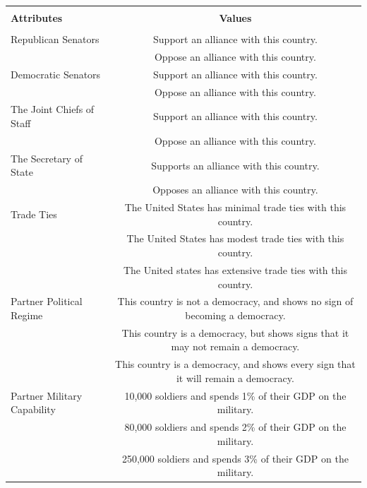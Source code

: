 \documentclass[12pt]{article}
\begin{document}
\begin{table}[htpb]
\begin{center}
\begin{adjustbox}{width = .85\textwidth}
\begin{tabular}{lc} 
\hline \\ 
\textbf{Attributes} & \textbf{Values} \\
\hline \\ 
Republican Senators & Support an alliance with this country. \\
                    & Oppose an alliance with this country. \\ 
                    
Democratic Senators & Support an alliance with this country. \\
                    & Oppose an alliance with this country. \\ 
                    
The Joint Chiefs of Staff & Support an alliance with this country. \\
                    & Oppose an alliance with this country. \\ 
                    
The Secretary of State & Supports an alliance with this country. \\
                    & Opposes an alliance with this country. \\ 
                    
Trade Ties          & The United States has minimal trade ties with this country. \\
                    & The United States has modest trade ties with this country. \\
                    & The United states has extensive trade ties with this country. \\ 
Partner Political Regime    & This country is not a democracy, and shows no sign of becoming a democracy. \\
                    & This country is a democracy, but shows signs that it may not remain a democracy. \\ %
                    & This country is a democracy, and shows every sign that it will remain a democracy. \\
                    
Partner Military Capability & 10,000 soldiers and spends 1\% of their GDP on the military. \\ %
                    & 80,000 soldiers and spends 2\% of their GDP on the military. \\ %
                    & 250,000 soldiers and spends 3\% of their GDP on the military. \\ %
                    

\end{tabular}
\end{adjustbox}
\end{center}
\end{table}
\end{document}
